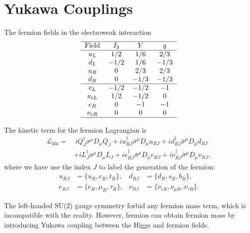\documentclass[aps,prb,superscriptaddress,nofootinbib]{revtex4}
\begin{document}
\section{Yukawa Couplings}
The fermion fields in the electroweak interaction
\begin{equation}
	\begin{tabular}{c c c c}
		\hline 
		Field & $I_3$ & $Y$ & $q$\\ \hline
		$u_L$ & $1/2$ & $1/6$ & $2/3$ \\ 
		$d_L$ & $-1/2$ & $1/6$ & $-1/3$ \\  
		$u_R$ & $0$ & $2/3$ & $2/3$ \\
		$d_R$ & $0$ & $-1/3$ & $-1/3$ \\ \hline
		$e_L$ & $-1/2$ & $-1/2$ & $-1$ \\ 
		$\nu_{eL}$ & $1/2$ & $-1/2$ & $0$ \\  
		$e_R$ & $0$ & $-1$ & $-1$ \\
		$\nu_{eR}$ & $0$ & $0$ & $0$ \\
		\hline 
	\end{tabular}
\end{equation}

The kinetic term for the fermion Lagrangian is
\begin{equation}
\begin{aligned}
	\mathcal L_{\mathrm{kin}}
	=&\ i Q^\dagger_J \sigma^\mu D_\mu Q_J + i u_{RJ}^\dagger \bar\sigma^\mu D_\mu u_{RJ} + i d_{RJ}^\dagger \bar\sigma^\mu D_\mu d_{RJ} \\
	& + i L^\dagger_J \sigma^\mu D_\mu L_J + i e_{RJ}^\dagger \bar\sigma^\mu D_\mu e_{RJ} + i \nu_{RJ}^\dagger \bar\sigma^\mu D_\mu \nu_{RJ},
\end{aligned}
\end{equation}
where we have use the index $J$ to label the generation of the fermion:
\begin{equation}
\begin{aligned}
	u_{RJ} &= \{u_R, c_R, t_R\}, & 
	d_{RJ} &= \{d_R, s_R, b_R\}, \\
	e_{RJ} &= \{e_R, \mu_R, \tau_R\}, &
	\nu_{RJ} &= \{\nu_{eR},\nu_{\mu R},\nu_{\tau R}\}.
\end{aligned}
\end{equation}

The left-handed SU(2) gauge symmetry forbid any fermion mass term, which is incompatible with the reality.
However, fermion can obtain fermion mass by introducing Yukawa coupling between the Higgs and fermion fields.
\end{document}
